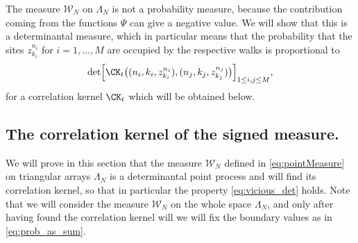 \documentclass[]{pcmi}
\theoremstyle{plain}
\theoremstyle{definition}
\begin{document}
The measure $\mathcal{W}_N$ on $\Lambda_N$ is not a probability measure, because the contribution coming from the functions $\Psi$ can give a negative value. We will show that this is a determinantal measure, which in particular means that the probability that the sites $z_{k_i}^{n_i}$ for $i=1,\ldots,M$ are occupied by the respective walks is proportional to
\begin{equation}\label{eq:vicious_det}
	\det \Bigl[\CK_t \big( (n_i, k_i, z_{k_i}^{n_i}), (n_j, k_j, z_{k_j}^{n_j}) \big)\Bigr]_{1 \leq i, j \leq M},
\end{equation}
for a correlation kernel $\CK_t$ which will be obtained below.

\subsection{The correlation kernel of the signed measure.}

We will prove in this section that the measure $\mathcal{W}_N$ defined in \eqref{eq:pointMeasure} on triangular arrays $\Lambda_N$ is a determinantal point process and will find its correlation kernel, so that in particular the property \eqref{eq:vicious_det} holds. Note that we will consider the measure $\mathcal{W}_N$ on the whole space $\Lambda_N$, and only after having found the correlation kernel will we will fix the boundary values as in \eqref{eq:prob_as_sum}.
\end{document}
